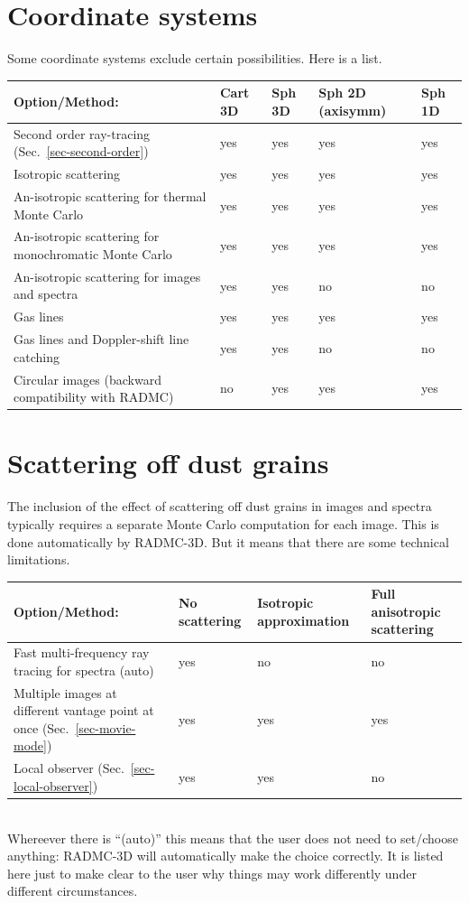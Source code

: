 \documentclass{report}
\begin{document}
\section{Coordinate systems}
Some coordinate systems exclude certain possibilities. Here is a list.\\
\begin{tabular}{lllll}
Option/Method:                 & Cart 3D & Sph 3D  & Sph 2D (axisymm) & Sph 1D \\
\hline
Second order ray-tracing  (Sec.~\ref{sec-second-order}) & yes & yes & yes & yes \\
Isotropic scattering           & yes & yes & yes & yes \\
An-isotropic scattering for thermal Monte Carlo & yes & yes & yes & yes  \\
An-isotropic scattering for monochromatic Monte Carlo & yes & yes & yes & yes  \\
An-isotropic scattering for images and spectra  & yes & yes & no  & no  \\
Gas lines                      & yes & yes & yes & yes \\
Gas lines and Doppler-shift line catching 
                               & yes & yes & no & no \\
Circular images (backward compatibility with RADMC)   & no  & yes  & yes & yes \\
\end{tabular}

\section{Scattering off dust grains}
The inclusion of the effect of scattering off dust grains in images and
spectra typically requires a separate Monte Carlo computation for each
image. This is done automatically by RADMC-3D. But it means that there are
some technical limitations.\\
\begin{tabular}{llll}
  Option/Method:                               & No scattering & Isotropic approximation  & Full anisotropic scattering \\
  \hline
  Fast multi-frequency ray tracing for spectra (auto) & yes & no  & no  \\
  Multiple images at different vantage point at once (Sec.~\ref{sec-movie-mode}) & yes & yes & yes \\
  Local observer (Sec.~\ref{sec-local-observer}) & yes & yes & no \\
\end{tabular}\\
Whereever there is ``(auto)'' this means that the user does not need to
set/choose anything: RADMC-3D will automatically make the choice correctly.
It is listed here just to make clear to the user why things may work
differently under different circumstances.
\end{document}
